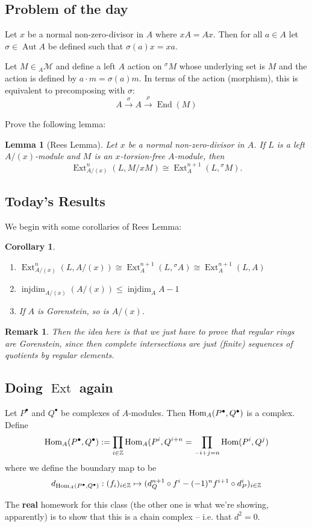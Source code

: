 \documentclass[12pt]{article}
\theoremstyle{break}
\theoremstyle{nonumberbreak}
\theoremstyle{changebreak}
\newtheorem{lem}[thm]{Lemma}
\newtheorem{cor}[thm]{Corollary}
\theoremstyle{break}
\theoremstyle{nonumberbreak}
\theoremstyle{nonumberplain}
\theoremstyle{change}
\newtheorem{rmk}[thm]{Remark}
\newcommand*{\Z}{
\mathbb{Z}
}
\DeclareMathOperator{\Aut}{Aut}
\DeclareMathOperator{\Ext}{Ext}
\DeclareMathOperator{\injdim}{injdim}
\DeclareMathOperator{\End}{End}
\newcommand*{\Hom}{\ensuremath\text{Hom}}
\newcommand*{\calM}{\mathcal{M}}
\begin{document}
\subsection{Problem of the day}
\begin{prob}
	Let $x$ be a normal non-zero-divisor in $A$ where $xA=Ax$. Then for all $a\in A$ let $\sigma\in\Aut A$ be defined such that
	$\sigma(a) x= xa$.

	Let $M\in {_A\calM}$ and define a left $A$ action on ${^\sigma M}$ whose underlying set is $M$ and the action is defined by $a\cdot m=\sigma(a)m$. In terms of the action (morphism), this is 
	equivalent to precomposing with $\sigma:$ 
	\[A\xrightarrow{\sigma} A\xrightarrow{\rho}\End(M)\]

	Prove the following lemma:
	\begin{lem}[Rees Lemma]
		Let $x$ be a normal non-zero-divisor in $A$. If $L$ is a left $A/(x)$-module and $M$ is an $x$-torsion-free $A$-module, then
		\[\Ext_{A/(x)}^n(L,M/xM)\cong \Ext_A^{n+1}(L,{^\sigma M}).\]
	\end{lem}
\end{prob}

\subsection{Today's Results}
We begin with some corollaries of Rees Lemma:
\begin{cor}
	\begin{enumerate}
		\item $\Ext_{A/(x)}^n(L, A/(x))\cong \Ext_A^{n+1}(L,{^\sigma A})\cong\Ext_A^{n+1}(L,A)$
		\item $\injdim_{A/(x)}(A/(x))\le \injdim_AA-1$
		\item If $A$ is Gorenstein, so is $A/(x)$.
	\end{enumerate}
\end{cor}
\begin{rmk}
	Then the idea here is that we just have to prove that regular rings are Gorenstein, since then complete intersections
	are just (finite) sequences of quotients by regular elements.
\end{rmk}
\subsection{Doing $\Ext$ again}
Let $P^\bullet$ and $Q^\bullet$ be complexes of $A$-modules. Then $\Hom_A(P^\bullet, Q^\bullet)$ is a complex. Define
\[\Hom_A(P^\bullet, Q^\bullet):=\prod_{i\in\Z}\Hom_A(P^i,Q^{i+n}=\prod_{-i+j=n}\Hom(P^i,Q^j)\]
where we define the boundary map to be 
\[d_{\Hom_A(P^\bullet,Q^\bullet)}:(f_i)_{i\in\Z}\mapsto (d_Q^{n+1}\circ f^i - (-1)^nf^{i+1}\circ d_P^i)_{i\in\Z}\]
\begin{prob}
	The \textbf{real} homework for this class (the other one is what we're showing, apparently) is to show that this is a
	chain complex -- i.e. that $d^2=0$.
\end{prob}
\end{document}
